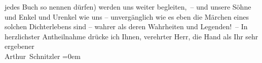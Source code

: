 \begin{ledgroupsized}[t]{13cm}
                    jedes Buch so nennen dürfen) werden uns weiter begleiten, – und unsere Söhne und
                    Enkel und Urenkel wie uns – unvergänglich wie es eben die Märchen eines solchen
                    Dichterlebens sind – wahrer als deren Wahrheiten und Legenden! –\pend
           \pstart
           In herzlichster Antheilnahme drücke ich Ihnen, verehrter Herr, die Hand als
                    Ihr sehr ergebener{\\[\baselineskip]}\spacefill\mbox{Arthur Schnitzler}\pend
           \leftskip=0em{}\endnumbering{}\end{ledgroupsized}  \newcommand{\dateiname}{L02318}\newcommand{\titel}{Arthur Schnitzler an Georg Engländer, 10. 1. 1919}\newcommand{\editorInnen}{Martin Anton Müller und Gerd-Hermann Susen}
      